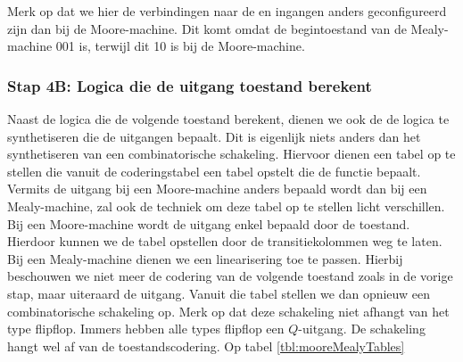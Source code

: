 Merk op dat we hier de verbindingen naar de \clrsin{} en \prsin{} ingangen anders geconfigureerd zijn dan bij de Moore-machine. Dit komt omdat de begintoestand van de Mealy-machine 001 is, terwijl dit 10 is bij de Moore-machine.
\subsubsection{Stap 4B: Logica die de uitgang toestand berekent}
Naast de logica die de volgende toestand berekent, dienen we ook de de logica te synthetiseren die de uitgangen bepaalt. Dit is eigenlijk niets anders dan het synthetiseren van een combinatorische schakeling. Hiervoor dienen een tabel op te stellen die vanuit de coderingstabel een tabel opstelt die de functie bepaalt. Vermits de uitgang bij een Moore-machine anders bepaald wordt dan bij een Mealy-machine, zal ook de techniek om deze tabel op te stellen licht verschillen. Bij een Moore-machine wordt de uitgang enkel bepaald door de toestand. Hierdoor kunnen we de tabel opstellen door de transitiekolommen weg te laten. Bij een Mealy-machine dienen we een linearisering toe te passen. Hierbij beschouwen we niet meer de codering van de volgende toestand zoals in de vorige stap, maar uiteraard de uitgang. Vanuit die tabel stellen we dan opnieuw een combinatorische schakeling op. Merk op dat deze schakeling niet afhangt van het type flipflop. Immers hebben alle types flipflop een $Q$-uitgang. De schakeling hangt wel af van de toestandscodering. Op tabel \ref{tbl:mooreMealyTables}
